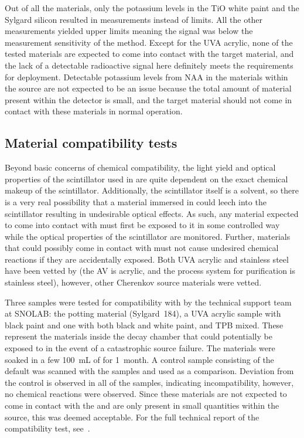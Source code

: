 Out of all the materials, only the potassium levels in the TiO white paint and the Sylgard silicon resulted in measurements instead of limits. 
All the other measurements yielded upper limits meaning the signal was below the measurement sensitivity of the method. 
Except for the UVA acrylic, none of the tested materials are expected to come into contact with the target material, and the lack of a detectable radioactive signal here definitely meets the requirements for deployment.
Detectable potassium levels from NAA in the materials within the source are not expected to be an issue because the total amount of material present within the detector is small, and the target material should not come in contact with these materials in normal operation.

\subsection{Material compatibility tests}
\label{sec:comptest}
Beyond basic concerns of chemical compatibility, the light yield and optical properties of the {\labppo} scintillator used in {\snop} are quite dependent on the exact chemical makeup of the scintillator.
Additionally, the scintillator itself is a solvent, so there is a very real possibility that a material immersed in {\labppo} could leech into the scintillator resulting in undesirable optical effects.
As such, any material expected to come into contact with {\labppo} must first be exposed to it in some controlled way while the optical properties of the scintillator are monitored.
Further, materials that could possibly come in contact with {\labppo} must not cause undesired chemical reactions if they are accidentally exposed.
Both UVA acrylic and stainless steel have been vetted by {\snop} (the AV is acrylic, and the process system for {\labppo} purification is stainless steel), however, other Cherenkov source materials were vetted.

Three samples were tested for compatibility with {\labppo} by the technical support team at SNOLAB: the potting material (Sylgard~184), a UVA acrylic sample with black paint and one with both black and white paint, and TPB mixed. 
These represent the materials inside the decay chamber that could potentially be exposed to {\labppo} in the event of a catastrophic source failure.
The materials were soaked in a few 100~mL of {\labppo} for 1~month. 
A control sample consisting of the default {\labppo} was scanned with the samples and used as a comparison. 
Deviation from the control is observed in all of the samples, indicating incompatibility, however, no chemical reactions were observed.
Since these materials are not expected to come in contact with the {\labppo} and are only present in small quantities within the source, this was deemed acceptable.
For the full technical report of the compatibility test, see~\cite{lina:2015}.



